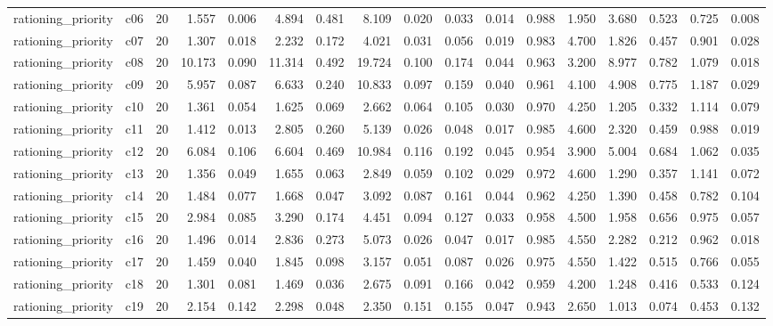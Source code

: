 \begin{table}[htbp]
\begin{tabular}{lrrrrrrrrrrrrrrrr}
rationing\_priority & c06 & 20 & 1.557 & 0.006 & 4.894 & 0.481 & 8.109 & 0.020 & 0.033 & 0.014 & 0.988 & 1.950 & 3.680 & 0.523 & 0.725 & 0.008 \\
rationing\_priority & c07 & 20 & 1.307 & 0.018 & 2.232 & 0.172 & 4.021 & 0.031 & 0.056 & 0.019 & 0.983 & 4.700 & 1.826 & 0.457 & 0.901 & 0.028 \\
rationing\_priority & c08 & 20 & 10.173 & 0.090 & 11.314 & 0.492 & 19.724 & 0.100 & 0.174 & 0.044 & 0.963 & 3.200 & 8.977 & 0.782 & 1.079 & 0.018 \\
rationing\_priority & c09 & 20 & 5.957 & 0.087 & 6.633 & 0.240 & 10.833 & 0.097 & 0.159 & 0.040 & 0.961 & 4.100 & 4.908 & 0.775 & 1.187 & 0.029 \\
rationing\_priority & c10 & 20 & 1.361 & 0.054 & 1.625 & 0.069 & 2.662 & 0.064 & 0.105 & 0.030 & 0.970 & 4.250 & 1.205 & 0.332 & 1.114 & 0.079 \\
rationing\_priority & c11 & 20 & 1.412 & 0.013 & 2.805 & 0.260 & 5.139 & 0.026 & 0.048 & 0.017 & 0.985 & 4.600 & 2.320 & 0.459 & 0.988 & 0.019 \\
rationing\_priority & c12 & 20 & 6.084 & 0.106 & 6.604 & 0.469 & 10.984 & 0.116 & 0.192 & 0.045 & 0.954 & 3.900 & 5.004 & 0.684 & 1.062 & 0.035 \\
rationing\_priority & c13 & 20 & 1.356 & 0.049 & 1.655 & 0.063 & 2.849 & 0.059 & 0.102 & 0.029 & 0.972 & 4.600 & 1.290 & 0.357 & 1.141 & 0.072 \\
rationing\_priority & c14 & 20 & 1.484 & 0.077 & 1.668 & 0.047 & 3.092 & 0.087 & 0.161 & 0.044 & 0.962 & 4.250 & 1.390 & 0.458 & 0.782 & 0.104 \\
rationing\_priority & c15 & 20 & 2.984 & 0.085 & 3.290 & 0.174 & 4.451 & 0.094 & 0.127 & 0.033 & 0.958 & 4.500 & 1.958 & 0.656 & 0.975 & 0.057 \\
rationing\_priority & c16 & 20 & 1.496 & 0.014 & 2.836 & 0.273 & 5.073 & 0.026 & 0.047 & 0.017 & 0.985 & 4.550 & 2.282 & 0.212 & 0.962 & 0.018 \\
rationing\_priority & c17 & 20 & 1.459 & 0.040 & 1.845 & 0.098 & 3.157 & 0.051 & 0.087 & 0.026 & 0.975 & 4.550 & 1.422 & 0.515 & 0.766 & 0.055 \\
rationing\_priority & c18 & 20 & 1.301 & 0.081 & 1.469 & 0.036 & 2.675 & 0.091 & 0.166 & 0.042 & 0.959 & 4.200 & 1.248 & 0.416 & 0.533 & 0.124 \\
rationing\_priority & c19 & 20 & 2.154 & 0.142 & 2.298 & 0.048 & 2.350 & 0.151 & 0.155 & 0.047 & 0.943 & 2.650 & 1.013 & 0.074 & 0.453 & 0.132 \\

\end{tabular}
\end{table}
